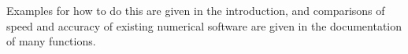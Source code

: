 Examples for how to do this are given in the introduction, and comparisons of speed and accuracy of
existing numerical software are given in the documentation of many functions.


\newpage





\sphinxtableofcontents
\pagestyle{normal}
\label{\detokenize{index::doc}}





